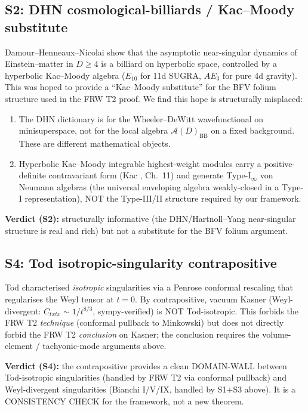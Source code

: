 \documentclass[11pt,a4paper]{article}
\theoremstyle{definition}
\newcommand{\AA}{\mathcal{A}}
\newcommand{\BB}{\mathrm{BB}}
\begin{document}
\subsection*{S2: DHN cosmological-billiards / Kac--Moody substitute}

Damour--Henneaux--Nicolai \cite{DHN2002} show that the asymptotic
near-singular dynamics of Einstein--matter in $D\ge 4$ is a billiard on
hyperbolic space, controlled by a hyperbolic Kac--Moody algebra ($E_{10}$
for 11d SUGRA, $AE_3$ for pure 4d gravity). This was hoped to provide a
``Kac--Moody substitute'' for the BFV folium structure used in the FRW T2
proof. We find this hope is structurally misplaced:
\begin{enumerate}
  \item The DHN dictionary is for the Wheeler--DeWitt wavefunctional on
  minisuperspace, not for the local algebra $\AA(D)_\BB$ on a fixed
  background. These are different mathematical objects.
  \item Hyperbolic Kac--Moody integrable highest-weight modules carry a
  positive-definite contravariant form (Kac \cite{Kac1990}, Ch.\ 11) and
  generate Type-I$_\infty$ von Neumann algebras (the universal
  enveloping algebra weakly-closed in a Type-I representation), NOT the
  Type-III/II structure required by our framework.
\end{enumerate}
\textbf{Verdict (S2):} structurally informative (the DHN/Hartnoll--Yang
near-singular structure is real and rich) but not a substitute for the
BFV folium argument.

\subsection*{S4: Tod isotropic-singularity contrapositive}

Tod \cite{Tod1987} characterised \emph{isotropic} singularities via a
Penrose conformal rescaling that regularises the Weyl tensor at $t=0$.
By contrapositive, vacuum Kasner (Weyl-divergent: $C_{txtx}\sim 1/t^{8/3}$,
sympy-verified) is NOT Tod-isotropic. This forbids the FRW T2
\emph{technique} (conformal pullback to Minkowski) but does not directly
forbid the FRW T2 \emph{conclusion} on Kasner; the conclusion requires
the volume-element / tachyonic-mode arguments above.

\textbf{Verdict (S4):} the contrapositive provides a clean DOMAIN-WALL
between Tod-isotropic singularities (handled by FRW T2 via conformal
pullback) and Weyl-divergent singularities (Bianchi I/V/IX, handled by
S1$+$S3 above). It is a CONSISTENCY CHECK for the framework, not a new
theorem.
\end{document}
